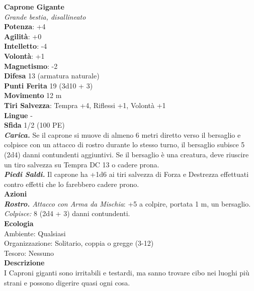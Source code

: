 \begin{multicols}{2}
\medskip\textbf{Caprone Gigante}\\
\emph{Grande bestia, disallineato}\\
\textbf{Potenza}: +4\\
\textbf{Agilità}: +0\\
\textbf{Intelletto}: -4\\
\textbf{Volontà}: +1\\
\textbf{Magnetismo}: -2\\
\textbf{Difesa} 13 (armatura naturale)\\
\textbf{Punti Ferita} 19 (3d10 + 3)\\
\textbf{Movimento} 12 m\\
\textbf{Tiri Salvezza}: Tempra +4, Riflessi +1, Volontà +1 \\
\textbf{Lingue} -\\
\textbf{Sfida} 1/2 (100 PE)\smallskip\\
\emph{\textbf{Carica.}} Se il caprone si muove di almeno 6 metri diretto verso il bersaglio e colpisce con un attacco di rostro durante lo stesso turno, il bersaglio subisce 5 (2d4) danni contundenti aggiuntivi. Se il bersaglio è una creatura, deve riuscire un tiro salvezza su Tempra DC 13 o cadere prona.\\
\emph{\textbf{Piedi Saldi.}} Il caprone ha +1d6 ai tiri salvezza di Forza e Destrezza effettuati contro effetti che lo farebbero cadere prono.\\
\smallskip\textbf{Azioni}\\
\emph{\textbf{Rostro.} Attacco con Arma da Mischia}: +5 a colpire, portata 1 m, un bersaglio.\\
\emph{Colpisce:} 8 (2d4 + 3) danni contundenti.\\
\textbf{Ecologia}\\
Ambiente: Qualsiasi\\
Organizzazione: Solitario, coppia o gregge (3-12)\\
Tesoro: Nessuno\\
\textbf{Descrizione}\\
I Caproni giganti sono irritabili e testardi, ma sanno trovare cibo nei luoghi più strani e possono digerire quasi ogni cosa. \\


\end{multicols}
